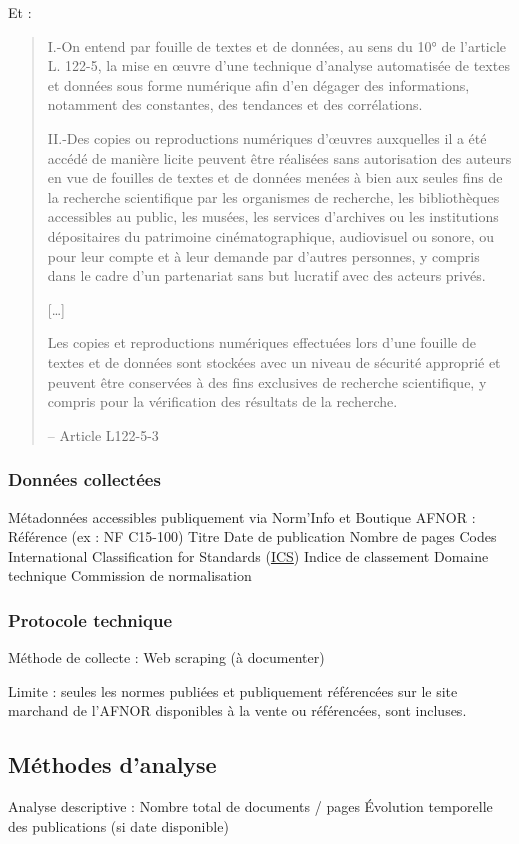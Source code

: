 \documentclass[a4paper,12pt]{article}
\begin{document}
Et :
\begin{quote}
I.-On entend par fouille de textes et de données, au sens du 10° de l'article L. 122-5, la mise en œuvre d'une technique d'analyse automatisée de textes et données sous forme numérique afin d'en dégager des informations, notamment des constantes, des tendances et des corrélations.

II.-Des copies ou reproductions numériques d'œuvres auxquelles il a été accédé de manière licite peuvent être réalisées sans autorisation des auteurs en vue de fouilles de textes et de données menées à bien aux seules fins de la recherche scientifique par les organismes de recherche, les bibliothèques accessibles au public, les musées, les services d'archives ou les institutions dépositaires du patrimoine cinématographique, audiovisuel ou sonore, ou pour leur compte et à leur demande par d'autres personnes, y compris dans le cadre d'un partenariat sans but lucratif avec des acteurs privés.

{[}\ldots{}]

Les copies et reproductions numériques effectuées lors d'une fouille de textes et de données sont stockées avec un niveau de sécurité approprié et peuvent être conservées à des fins exclusives de recherche scientifique, y compris pour la vérification des résultats de la recherche.

-- Article L122-5-3\autocite{CodeProprieteIntellectuelle}
\end{quote}
\subsubsection{Données collectées}
\label{sec:orgbe018a6}
Métadonnées accessibles publiquement via Norm’Info et Boutique AFNOR :
    Référence (ex : NF C15-100)
    Titre
    Date de publication
    Nombre de pages
    Codes International Classification for Standards
 (\protect\hyperlink{gls-10}{\label{gls-10-use-1}ICS})
    Indice de classement
    Domaine technique
    Commission de normalisation
\subsubsection{Protocole technique}
\label{sec:org1ee43ba}
Méthode de collecte : Web scraping (à documenter)

Limite : seules les normes publiées et publiquement référencées sur le site marchand de l'AFNOR disponibles à la vente ou référencées, sont incluses.
\subsection{Méthodes d'analyse}
\label{sec:org84ec3d6}
Analyse descriptive :
    Nombre total de documents / pages
    Évolution temporelle des publications (si date disponible)
\end{document}
